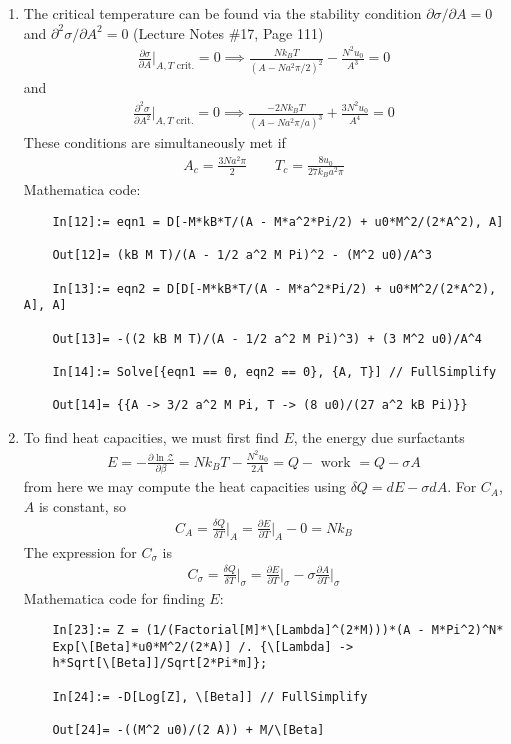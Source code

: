 \documentclass{article}
\theoremstyle{definition}
\newcommand{\p}{\partial}
\newcommand{\be}{\beta}
\newcommand{\f}[2]{\frac{#1}{#2}}
\newcommand{\lp}{\left(}
\newcommand{\rp}{\right)}
\begin{document}
\begin{enumerate}[label=(\alph*)]
	\item The critical temperature can be found via the stability condition $\p \sigma / \p A = 0$ and $\p^2 \sigma/ \p A^2 = 0$ (Lecture Notes \#17, Page 111)
	\begin{align*}
	\f{\p \sigma}{\p A}\bigg\vert_{A,T \text{ crit.}} = 0 \implies \f{N k_B T}{ \lp A - N a^2 \pi/2 \rp^2} - \f{N^2 u_0}{A^3} = 0
	\end{align*}
	and 
	\begin{align*}
	\f{\p^2 \sigma}{\p A^2}\bigg\vert_{A,T \text{ crit.}}  = 0 \implies \f{-2 N k_BT}{ \lp A -  N a^2 \pi/a \rp^3} + \f{3 N^2 u_0}{A^4} = 0 
	\end{align*}
	These conditions are simultaneously met if 
	\begin{align*}
	\boxed{A_c = \f{3N a^2 \pi}{2} \quad\quad T_c = \f{8 u_0}{27 k_B a^2 \pi} }
	\end{align*}
	Mathematica code:
	\begin{lstlisting}
	In[12]:= eqn1 = D[-M*kB*T/(A - M*a^2*Pi/2) + u0*M^2/(2*A^2), A]
	
	Out[12]= (kB M T)/(A - 1/2 a^2 M Pi)^2 - (M^2 u0)/A^3
	
	In[13]:= eqn2 = D[D[-M*kB*T/(A - M*a^2*Pi/2) + u0*M^2/(2*A^2), A], A]
	
	Out[13]= -((2 kB M T)/(A - 1/2 a^2 M Pi)^3) + (3 M^2 u0)/A^4
	
	In[14]:= Solve[{eqn1 == 0, eqn2 == 0}, {A, T}] // FullSimplify
	
	Out[14]= {{A -> 3/2 a^2 M Pi, T -> (8 u0)/(27 a^2 kB Pi)}}
	\end{lstlisting}
	
	
	
	\item To find heat capacities, we must first find $E$, the energy due surfactants
	\begin{align*}
	E = -\f{\p \ln \mathcal{Z}}{\p \be} = N k_B T - \f{N^2 u_0}{2A} = Q - \text{ work } = Q - \sigma A 
	\end{align*}
	from here we may compute the heat capacities using $\delta Q = d E - \sigma d A$. For $C_A$, $A$ is constant, so
	\begin{align*}
	\boxed{C_A = \f{\delta Q}{\delta T}\bigg\vert_{A}  = \f{\p E}{\p T}\bigg\vert_{A} - 0  = N k_B}
	\end{align*}
	The expression for $C_\sigma$ is 
	\begin{align*}
	\boxed{C_\sigma = \f{\delta Q}{ \delta T}\bigg\vert_{\sigma} = \f{\p E}{\p T}\bigg\vert_\sigma - \sigma \f{\p A}{\p T}\bigg\vert_{\sigma}}
	\end{align*}
	Mathematica code for finding $E$:
	\begin{lstlisting}
	In[23]:= Z = (1/(Factorial[M]*\[Lambda]^(2*M)))*(A - M*Pi^2)^N*
	Exp[\[Beta]*u0*M^2/(2*A)] /. {\[Lambda] -> 
	h*Sqrt[\[Beta]]/Sqrt[2*Pi*m]};
	
	In[24]:= -D[Log[Z], \[Beta]] // FullSimplify
	
	Out[24]= -((M^2 u0)/(2 A)) + M/\[Beta]
	\end{lstlisting}
\end{enumerate}
\end{document}
